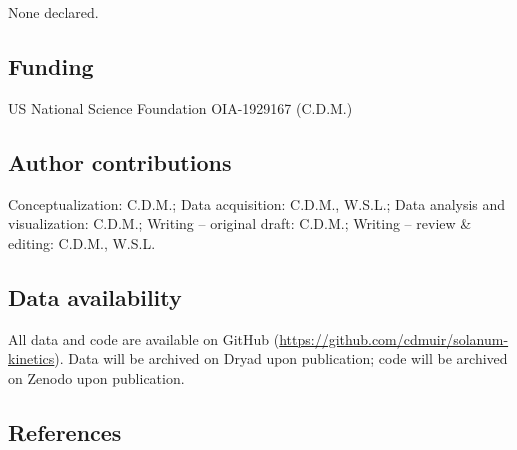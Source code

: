\documentclass[
  letterpaper,
  DIV=11,
  numbers=noendperiod]{scrartcl}
\begin{document}
None declared.

\subsection{Funding}\label{funding}

US National Science Foundation OIA-1929167 (C.D.M.)

\subsection{Author contributions}\label{author-contributions}

Conceptualization: C.D.M.; Data acquisition: C.D.M., W.S.L.; Data
analysis and visualization: C.D.M.; Writing -- original draft: C.D.M.;
Writing -- review \& editing: C.D.M., W.S.L.

\subsection{Data availability}\label{data-availability}

All data and code are available on GitHub
(\url{https://github.com/cdmuir/solanum-kinetics}). Data will be
archived on Dryad upon publication; code will be archived on Zenodo upon
publication.

\subsection{References}\label{references}

\singlespacing
\end{document}
